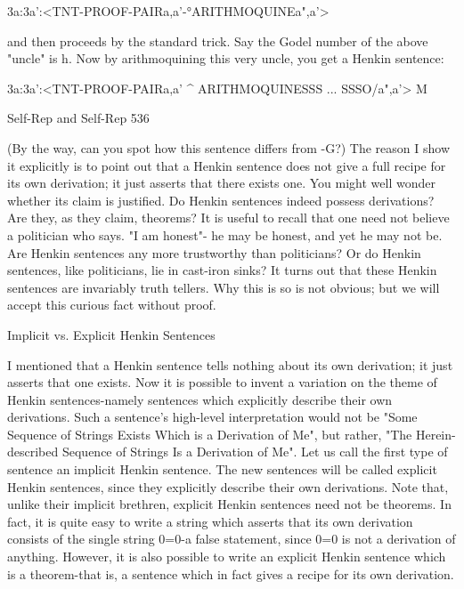 {3a:3a':<TNT-PROOF-PAIR{a,a'}-°ARITHMOQUINE{a",a'}>

and then proceeds by the standard trick. Say the Godel number of the above "uncle" is h.
Now by arithmoquining this very uncle, you get a Henkin sentence:

3a:3a':<TNT-PROOF-PAIR{a,a'} ^ ARITHMOQUINE{SSS ... SSSO/a",a'}> M




Self-Rep and Self-Rep                                                                         536

 (By the way, can you spot how this sentence differs from -G?) The reason I show it
explicitly is to point out that a Henkin sentence does not give a full recipe for its own
derivation; it just asserts that there exists one. You might well wonder whether its claim is
justified. Do Henkin sentences indeed possess derivations? Are they, as they claim,
theorems? It is useful to recall that one need not believe a politician who says. "I am honest"-
he may be honest, and yet he may not be. Are Henkin sentences any more trustworthy than
politicians? Or do Henkin sentences, like politicians, lie in cast-iron sinks?
         It turns out that these Henkin sentences are invariably truth tellers. Why this is so is
not obvious; but we will accept this curious fact without proof.

                           Implicit vs. Explicit Henkin Sentences

I mentioned that a Henkin sentence tells nothing about its own derivation; it just asserts that
one exists. Now it is possible to invent a variation on the theme of Henkin sentences-namely
sentences which explicitly describe their own derivations. Such a sentence's high-level
interpretation would not be "Some Sequence of Strings Exists Which is a Derivation of Me",
but rather, "The Herein-described Sequence of Strings           Is a Derivation of Me". Let us
call the first type of sentence an implicit Henkin sentence. The new sentences will be called
explicit Henkin sentences, since they explicitly describe their own derivations. Note that,
unlike their implicit brethren, explicit Henkin sentences need not be theorems. In fact, it is
quite easy to write a string which asserts that its own derivation consists of the single string
0=0-a false statement, since 0=0 is not a derivation of anything. However, it is also possible
to write an explicit Henkin sentence which is a theorem-that is, a sentence which in fact gives
a recipe for its own derivation.

}
